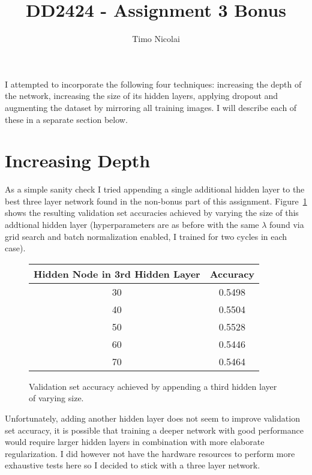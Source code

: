 \documentclass{article}
\begin{document}
\title{DD2424 - Assignment 3 Bonus}
\author{Timo Nicolai}

\maketitle

\noindent
I attempted to incorporate the following four techniques: increasing the depth
of the network, increasing the size of its hidden layers, applying dropout
and augmenting the dataset by mirroring all training images. I will describe
each of these in a separate section below.

\section{Increasing Depth}

As a simple sanity check I tried appending a single additional hidden layer to
the best three layer network found in the non-bonus part of this assignment.
Figure~\ref{fig:depth} shows the resulting validation set accuracies achieved
by varying the size of this addtional hidden layer (hyperparameters are as
before with the same $\lambda$ found via grid search and batch normalization
enabled, I trained for two cycles in each case).

\begin{figure}[H]
  \centering
    \footnotesize
    \begin{tabular}{|c|c|}
    \hline
    Hidden Node in 3rd Hidden Layer & Accuracy \\
    \hline
    30                              & 0.5498   \\
    \hline
    40                              & 0.5504   \\
    \hline
    50                              & 0.5528   \\
    \hline
    60                              & 0.5446   \\
    \hline
    70                              & 0.5464   \\
    \hline
    \end{tabular}
  \caption{Validation set accuracy achieved by appending a third hidden layer
           of varying size.}
  \label{fig:depth}
\end{figure}

\noindent
Unfortunately, adding another hidden layer does not seem to improve validation
set accuracy, it is possible that training a deeper network with good
performance would require larger hidden layers in combination with more
elaborate regularization.  I did however not have the hardware resources to
perform more exhaustive tests here so I decided to stick with a three layer
network.
\end{document}
